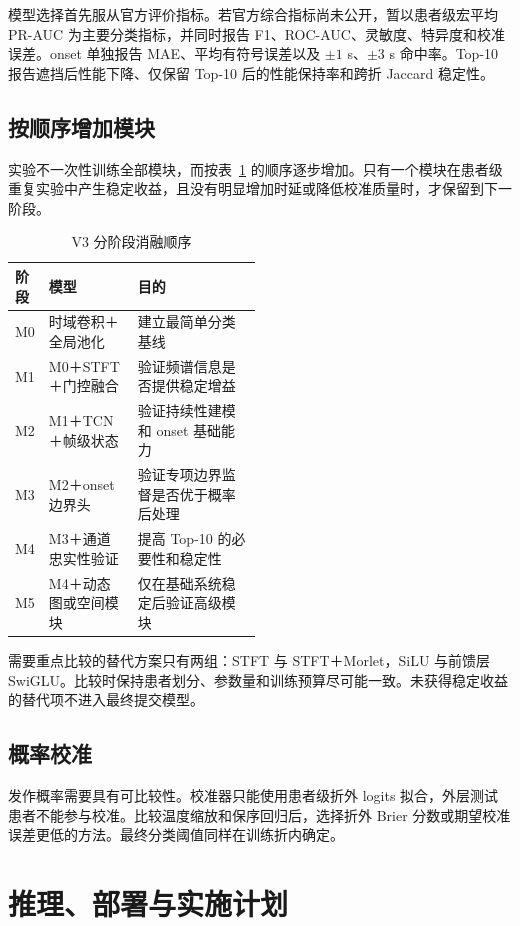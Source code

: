 模型选择首先服从官方评价指标。若官方综合指标尚未公开，暂以患者级宏平均 PR-AUC 为主要分类指标，并同时报告 F1、ROC-AUC、灵敏度、特异度和校准误差。onset 单独报告 MAE、平均有符号误差以及 $\pm1$ s、$\pm3$ s 命中率。Top-10 报告遮挡后性能下降、仅保留 Top-10 后的性能保持率和跨折 Jaccard 稳定性。

\subsection{按顺序增加模块}

实验不一次性训练全部模块，而按表~\ref{tab:ablation-v3} 的顺序逐步增加。只有一个模块在患者级重复实验中产生稳定收益，且没有明显增加时延或降低校准质量时，才保留到下一阶段。

\begin{table}[htbp]
\centering
{}
\caption{V3 分阶段消融顺序}
\label{tab:ablation-v3}
\renewcommand{\arraystretch}{1.35}
\begin{tabularx}{\linewidth}{@{}p{0.13\linewidth}p{0.36\linewidth}X@{}}
\toprule
\textbf{阶段} & \textbf{模型} & \textbf{目的} \\
\midrule
M0 & 时域卷积＋全局池化 & 建立最简单分类基线 \\
M1 & M0＋STFT＋门控融合 & 验证频谱信息是否提供稳定增益 \\
M2 & M1＋TCN＋帧级状态 & 验证持续性建模和 onset 基础能力 \\
M3 & M2＋onset 边界头 & 验证专项边界监督是否优于概率后处理 \\
M4 & M3＋通道忠实性验证 & 提高 Top-10 的必要性和稳定性 \\
M5 & M4＋动态图或空间模块 & 仅在基础系统稳定后验证高级模块 \\
\bottomrule
\end{tabularx}
\end{table}

需要重点比较的替代方案只有两组：STFT 与 STFT＋Morlet，SiLU 与前馈层 SwiGLU。比较时保持患者划分、参数量和训练预算尽可能一致。未获得稳定收益的替代项不进入最终提交模型。

\subsection{概率校准}

发作概率需要具有可比较性。校准器只能使用患者级折外 logits 拟合，外层测试患者不能参与校准。比较温度缩放和保序回归后，选择折外 Brier 分数或期望校准误差更低的方法。最终分类阈值同样在训练折内确定。

\section{推理、部署与实施计划}

